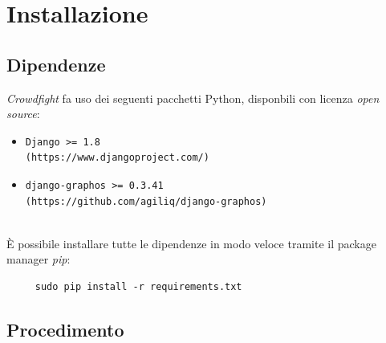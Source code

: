 \documentclass{scrreprt}
\begin{document}

\chapter{Installazione}

\section{Dipendenze}

\textit{Crowdfight} fa uso dei seguenti pacchetti Python, disponbili con licenza \textit{open source}:
\\
\begin{itemize}
	\item
		\begin{lstlisting}
Django >= 1.8
(https://www.djangoproject.com/)
		\end{lstlisting}
		
	\item
		\begin{lstlisting}
django-graphos >= 0.3.41
(https://github.com/agiliq/django-graphos)
		\end{lstlisting}
\end{itemize}
\textit{ }\\
È possibile installare tutte le dipendenze in modo veloce tramite il package manager \textit{pip}:

\begin{lstlisting}
     sudo pip install -r requirements.txt
\end{lstlisting}


\section{Procedimento}
\end{document}
